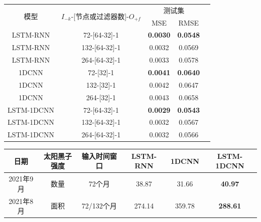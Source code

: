 \begin{table}[!htbp]
  \centering
  \label{tab:ss_number_out_1}
  \footnotesize
  \renewcommand{\arraystretch}{1}
  \begin{tabular}{ccccc}
    \toprule
    \multirow{2}{*}{模型} & \multirow{2}{*}{$I_{-k}$-[节点或过滤器数]-$O_{+f}$} & \multicolumn{2}{c}{测试集}\\
    \cmidrule(lr){3-4}
    \noalign{\smallskip}
    & & MSE & RMSE\\
    \midrule 
    LSTM-RNN & 72-[64-32]-1 & \textbf{0.0030} & \textbf{0.0548} \\
    LSTM-RNN & 132-[64-32]-1 & 0.0032 & 0.0569 \\
    LSTM-RNN & 264-[64-32]-1 & 0.0033 & 0.0578 \\
    \hline
    1DCNN & 72-[32]-1 & \textbf{0.0041} & \textbf{0.0640} \\
    1DCNN & 132-[32]-1 & 0.0042 & 0.0647 \\
    1DCNN & 264-[32]-1 & 0.0043 & 0.0658 \\
    \hline
    LSTM-1DCNN & 72-[64-32]-1 & \textbf{0.0029} & \textbf{0.0543} \\
    LSTM-1DCNN & 132-[64-32]-1 & 0.0032 & 0.0567 \\
    LSTM-1DCNN & 264-[64-32]-1 & 0.0032 & 0.0566 \\
    \bottomrule
  \end{tabular}
\end{table}

\begin{table}[!htbp]
\centering
{}
\label{tab:ss_out_1}
\footnotesize
\begin{tabular}{cccccc}
    \toprule
    日期 & 太阳黑子强度 & 输入时间窗口 & LSTM-RNN & 1DCNN & LSTM-1DCNN  \\
    \midrule
    2021年9月 & 数量 & 72个月 & 38.87 & 31.66 & \textbf{40.97} \\
    2021年8月 & 面积 & 72/132个月 & 274.14 & 359.78 & \textbf{288.61} \\
    \bottomrule
  \end{tabular}
\end{table}

